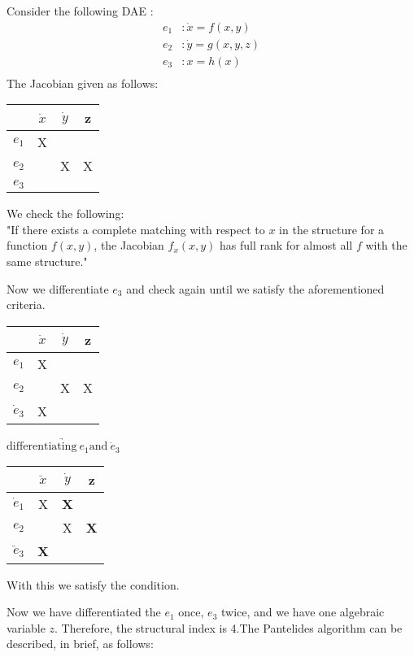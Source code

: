 Consider the following DAE :
\begin{align*}
	e_1 &: \dot x = f(x,y)\\
	e_2 &: \dot y = g(x,y,z)\\
	e_3 &: x = h(x)\\
\end{align*}
The Jacobian given as follows:
\begin{center}
	\begin{tabular}{c|c c c}
		& $\dot x$ & $\dot y$ & z \\
		\hline
		$e_1$ & X & & \\
		$e_2$ & & X & X \\
		$e_3$ & & & \\
	\end{tabular}  
\end{center}
We check the following: \\
"If there exists a complete matching with respect to $x$ in the structure for a function $f(x,y)$, the Jacobian $f_x(x,y)$ has full rank for almost all $f$ with the same structure." 

Now we differentiate $e_3$ and check again until we satisfy the aforementioned criteria.
\begin{center}
	\begin{tabular}{c|c c c}
		& $\dot x$ & $\dot y$ & z \\
		\hline
		$e_1$ & X & & \\
		$e_2$ & & X & X \\
		$\dot e_3$ & X & & \\
	\end{tabular} $\underrightarrow{\text{differentiating}\ e_1 \text{and}\ \dot e_3}$ 
	\begin{tabular}{c|c c c}
		& $\ddot x$ & $\dot y$ & z \\
		\hline
		$\dot e_1$ & X & \textbf{X} & \\
		$e_2$ & & X & \textbf{X} \\
		$\ddot e_3$ & \textbf{X} & & \\
	\end{tabular}
\end{center}
With this we satisfy the condition. 

Now we have differentiated the $e_1$ once, $e_3$ twice, and we have one algebraic variable $z$. Therefore, the structural index is 4.The Pantelides algorithm can be described, in brief, as follows:

